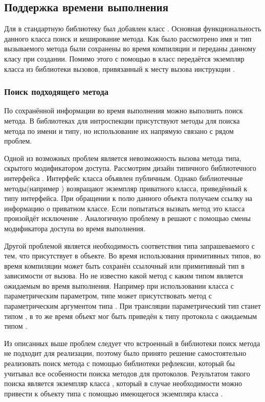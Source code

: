 \subsection{Поддержка времени выполнения} \label{runtime_info}
Для в стандартную библиотеку был добавлен класс . Основная функциональность данного класса поиск и кеширование метода. Как было рассмотрено имя и тип вызываемого метода были сохранены во время компиляции и переданы данному класу при создании. Помимо этого с помощью  в класс передаётся экземпляр класса  из библиотеки вызовов, привязанный к месту вызова инструкции .

\subsubsection{Поиск подходящего метода}
По сохранённой информации во время выполнения можно выполнить поиск метода. В библиотеках для интроспекции присутствуют методы для поиска метода по имени и типу, но использование их напрямую связано с рядом проблем.

Одной из возможных проблем является невозможность вызова метода типа, скрытого модификатором доступа. Рассмотрим дизайн типичного библиотечного интерфейса . Интерфейс класса объявлен публичным. Однако библиотечные методы(например ) возвращают экземпляр приватного класса, приведённый к типу интерфейса. При обращении к полю  данного объекта получаем ссылку на информацию о приватном классе. Если попытаться вызвать метод это класса произойдёт исключение . Аналогичную проблему в  решают с помощью смены модификатора доступа во время выполнения.

Другой проблемой является необходимость соответствия типа запрашеваемого с тем, что присутствует в объекте. Во время использования примитивных типов, во время компиляции может быть сохранён ссылочный или примитивный тип в зависимости от вызова. Но не известно какой метод с каким типом является ожидаемым во время выполнения. Например при использовании класса с параметрическим параметром, типе может присутствовать метод с параметрическим аргументом типа . При трансляции параметрический тип станет типом , в то же время объект мог быть приведён к типу протокола с ожидаемым типом .

Из описанных выше проблем следует что встроенный в библиотеки поиск метода не подходит для реализации, поэтому было принято решение самостоятельно реализовать поиск метода с помощью библиотеки рефлексии, который бы учитывал все особенности поиска методов для протоколов. Результатом такого поиска является экземпляр класса , который в случае необходимости можно привести к объекту типа  с помощью имеющегося экземпляра класса .

